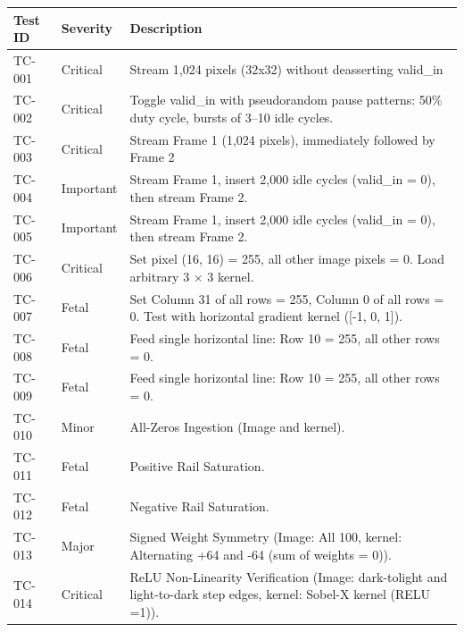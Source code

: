 \documentclass[12pt, a4paper]{article}
\begin{document}
\begin{longtable}{@{}p{} p{} p{}@{}}
\toprule
\textbf{Test ID} & \textbf{Severity} & \textbf{Description} \\
\midrule
\endhead
TC-001 & Critical & Stream 1,024 pixels (32x32) without deasserting valid\_in \\

TC-002 & Critical & Toggle valid\_in with pseudorandom pause patterns: 50\% duty cycle, bursts of 3–10 idle cycles. \\

TC-003 & Critical & Stream Frame 1 (1,024 pixels), immediately followed by Frame 2 \\

TC-004 & Important & Stream Frame 1, insert 2,000 idle cycles (valid\_in = 0), then stream Frame 2. \\

TC-005 & Important & Stream Frame 1, insert 2,000 idle cycles (valid\_in = 0), then stream Frame 2. \\

TC-006 & Critical & Set pixel (16, 16) = 255, all other image pixels = 0. Load arbitrary 3 × 3 kernel. \\

TC-007 & Fetal & Set Column 31 of all rows = 255, Column 0 of all rows = 0. Test with horizontal gradient kernel ([-1, 0, 1]). \\

TC-008 & Fetal & Feed single horizontal line: Row 10 = 255, all other rows = 0. \\

TC-009 & Fetal & Feed single horizontal line: Row 10 = 255, all other rows = 0. \\

TC-010 & Minor & All-Zeros Ingestion (Image and kernel). \\

TC-011 & Fetal & Positive Rail Saturation. \\

TC-012 & Fetal & Negative Rail Saturation. \\

TC-013 & Major & Signed Weight Symmetry (Image: All 100, kernel: Alternating +64 and -64 (sum of weights = 0)). \\

TC-014 & Critical & ReLU Non-Linearity Verification (Image: dark-tolight and light-to-dark step edges, kernel: Sobel-X kernel (RELU =1)). \\


\end{longtable}
\end{document}
